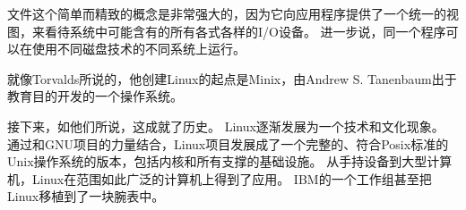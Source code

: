 {{        文件这个简单而精致的概念是非常强大的，因为它向应用程序提供了一个统一的视图，来看待系统中可能含有的所有各式各样的I/O设备。
        进一步说，同一个程序可以在使用不同磁盘技术的不同系统上运行。

        \begin{sidenote}
            就像Torvalds所说的，他创建Linux的起点是Minix，由Andrew S. Tanenbaum出于教育目的开发的一个操作系统。

            接下来，如他们所说，这成就了历史。
            Linux逐渐发展为一个技术和文化现象。
            通过和GNU项目的力量结合，Linux项目发展成了一个完整的、符合Posix标准的Unix操作系统的版本，包括内核和所有支撑的基础设施。
            从手持设备到大型计算机，Linux在范围如此广泛的计算机上得到了应用。
            IBM的一个工作组甚至把Linux移植到了一块腕表中。
        \end{sidenote}
    }
}

\endinput
